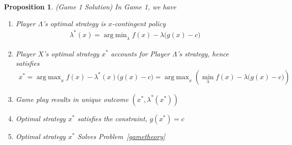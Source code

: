 \documentclass[12pt]{article}
\numberwithin{equation}{section} %
\theoremstyle{plain}
\newtheorem{prop}[thm]{Proposition}
\theoremstyle{definition}
\theoremstyle{remark}
\DeclareMathOperator*{\argmin}{arg\;min}
\DeclareMathOperator*{\argmax}{arg\;max}
\begin{document}
\begin{prop}
\label{prop:game1}
\emph{(Game 1 Solution)}
In Game 1, we have
\begin{enumerate}[label=\emph{(\roman*)}]
  \item Player $\Lambda$'s optimal strategy is $x$-contingent policy
    \begin{align*}
      \lambda^*(x) = \argmin_\lambda f(x)-\lambda\big(g(x)-c\big)
    \end{align*}
  \item
    Player $X$'s optimal strategy $x^*$ accounts for Player $\Lambda$'s
    strategy, hence satisfies
    \begin{align}
      x^*
      = \argmax_x f(x)-\lambda^*(x)\big(g(x)-c\big)
      = \argmax_x \left(
      \min_\lambda f(x)-\lambda\big(g(x)-c\big)
      \right)
      \label{gametheoryxopt}
    \end{align}
  \item Game play results in unique outcome $(x^*,\lambda^*(x^*))$
  \item Optimal strategy $x^*$ satisfies the constraint, $g(x^*)=c$
  \item Optimal strategy $x^*$ Solves Problem~\ref{gametheory}
\end{enumerate}
\end{prop}
\clearpage
\end{document}
